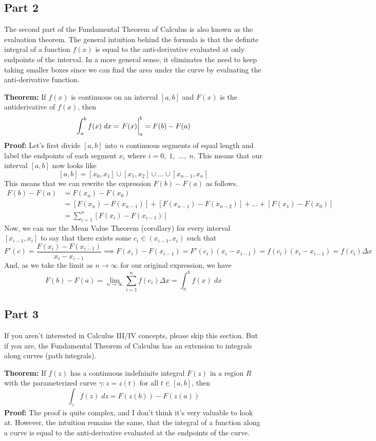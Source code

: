 \documentclass[8pt]{extarticle}
\begin{document}
\subsection{Part 2}
The second part of the Fundamental Theorem of Calculus is also known as the evaluation theorem. The general intuition behind the formula is that the definite integral of a function $f(x)$ is equal to the anti-derivative evaluated at only endpoints of the interval. In a more general sense, it eliminates the need to keep taking smaller boxes since we can find the area under the curve by evaluating the anti-derivative function.
\begin{boxedsection}
  \textbf{Theorem:} If $f(x)$ is continuous on an interval $[a,b]$ and $F(x)$ is the antiderivative of $f(x)$, then
$$
  \int_a^b f(x)\;dx = \eval{F(x)}_a^b = F(b) - F(a)
$$
\textbf{Proof:} Let's first divide $[a,b]$ into $n$ continuous segments of equal length and label the endpoints of each segment $x_i$ where $i = 0,\;1,\;\dots,\;n$. This means that our interval $[a,b]$ now looks like
$$
[a,b] = [x_0,x_1] \cup [x_1,x_2] \cup \dots \cup [x_{n-1},x_n]
$$
This means that we can rewrite the expression $F(b) - F(a)$ as follows.
\begin{align*}
F(b) - F(a) &= F(x_n) - F(x_0)\\
&=  \left[F(x_n) - F(x_{n-1})\right] + \left[F(x_{n-1}) - F(x_{n-2})\right] + \dots + \left[F(x_1) - F(x_0)\right]\\
&= \sum_{i=1}^n \left[F(x_i) - F(x_{i-1})\right]
\end{align*}
Now, we can use the Mean Value Theorem (corollary) for every interval $[x_{i-1}, x_i]$ to say that there exists some $c_i \in (x_{i-1},x_i)$ such that
$$
F'(c) = \frac{F(x_i) - F(x_{i-1})}{x_i - x_{i-1}} \implies F(x_i) - F(x_{i-1}) = F'(c_i)(x_i - x_{i-1}) = f(c_i)(x_i - x_{i-1}) = f(c_i)\Delta x
$$
And, as we take the limit as $n \rightarrow \infty$ for our original expression, we have
$$
F(b) - F(a) = \lim_{n\rightarrow \infty} \sum_{i=1}^n f(c_i) \Delta x = \int_a^b f(x)\;dx 
$$
\end{boxedsection}
\subsection{Part 3}
If you aren't interested in Calculus III/IV concepts, please skip this section. But if you are, the Fundamental Theorem of Calculus has an extension to integrals along curves (path integrals). 
\begin{boxedsection}
  \textbf{Theorem:} If $f(z)$ has a continuous indefninite integral $F(z)$ in a region $R$ with the parameterized curve $\gamma: z = z(t)$ for all $t \in [a,b]$, then
  $$
  \int_\gamma f(z)\;dz = F(z(b)) - F(z(a))
  $$
  \textbf{Proof:} The proof is quite complex, and I don't think it's very valuable to look at. However, the intuition remains the same, that the integral of a function along a curve is equal to the anti-derivative evaluated at the endpoints of the curve.
\end{boxedsection}
\end{document}
